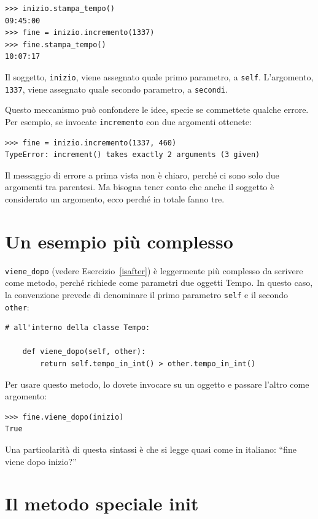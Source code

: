 \documentclass[10pt]{book}
\begin{document}
\begin{verbatim}
>>> inizio.stampa_tempo()
09:45:00
>>> fine = inizio.incremento(1337)
>>> fine.stampa_tempo()
10:07:17
\end{verbatim}
%
Il soggetto, {\tt inizio}, viene assegnato quale primo parametro, a
{\tt self}.  L'argomento, {\tt 1337}, viene assegnato quale secondo parametro, a {\tt secondi}.

Questo meccanismo può confondere le idee, specie se commettete qualche errore. Per esempio, se invocate {\tt incremento} con due argomenti ottenete:

\begin{verbatim}
>>> fine = inizio.incremento(1337, 460)
TypeError: increment() takes exactly 2 arguments (3 given)
\end{verbatim}
%
Il messaggio di errore a prima vista non è chiaro, perché ci sono solo due argomenti tra parentesi. Ma bisogna tener conto che anche il soggetto è considerato un argomento, ecco perché in totale fanno tre.


\section{Un esempio più complesso}

\verb"viene_dopo" (vedere Esercizio~\ref{isafter}) è leggermente più complesso da scrivere come metodo, perché richiede come parametri due oggetti Tempo. In questo caso, la convenzione prevede di denominare il primo parametro {\tt self} e il secondo {\tt other}:

\begin{verbatim}
# all'interno della classe Tempo:

    def viene_dopo(self, other):
        return self.tempo_in_int() > other.tempo_in_int()
\end{verbatim}
%
Per usare questo metodo, lo dovete invocare su un oggetto e passare l'altro come argomento:

\begin{verbatim}
>>> fine.viene_dopo(inizio)
True
\end{verbatim}
%
Una particolarità di questa sintassi è che si legge quasi come in italiano:
``fine viene dopo inizio?''


\section{Il metodo speciale init}
\end{document}
